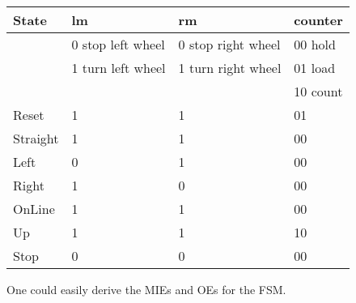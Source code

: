 \begin{enumerate}
\begin{onlysolution}
{                \begin{tabular}{l|l|l|l}
                    State & lm          & rm            & counter \\ \hline
                    & 0 stop left wheel & 0 stop right wheel  & 00 hold \\ \hline
                    & 1 turn left wheel & 1 turn right wheel  & 01 load \\ \hline
                    &                   &                     & 10 count\\ \hline \hline
                    Reset     & 1          & 1            & 01      \\ \hline
                    Straight & 1          & 1            & 00      \\ \hline
                    Left     & 0          & 1            & 00      \\ \hline
                    Right    & 1          & 0            & 00      \\ \hline
                    OnLine   & 1          & 1            & 00      \\ \hline
                    Up     & 1          & 1            & 10      \\ \hline
                    Stop     & 0          & 0            & 00      \\
                \end{tabular}

                One could easily derive the MIEs and OEs for the FSM.
            }
        \end{onlysolution}


\end{enumerate}
